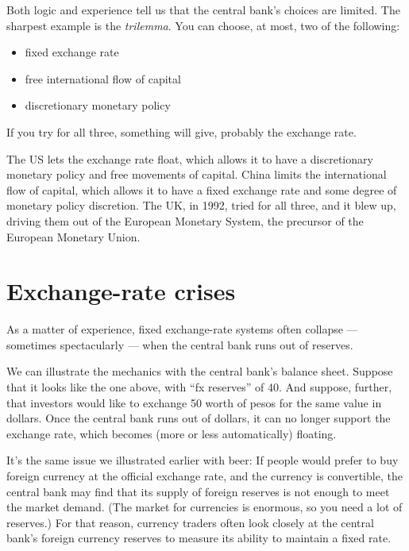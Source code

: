 Both logic and experience tell us that the central bank's  choices are limited.
The sharpest example is the {\it trilemma\/}.
You can choose, at most, two of the following:
\begin{itemize}
\item fixed exchange rate
\item free international flow of capital
\item discretionary monetary policy 
\end{itemize}
If you try for all three, something will give, probably the exchange rate.

The US lets the exchange rate float, which allows it to have a discretionary
monetary policy and free movements of capital.
China limits the international flow of capital,
which allows it to have a fixed exchange rate and some degree of monetary policy discretion.
The UK, in 1992, tried for all three, and it blew up, driving them out
of the European Monetary System, the precursor of the European Monetary Union.


\section{Exchange-rate crises}

As a matter of experience, fixed exchange-rate systems often collapse ---
sometimes spectacularly --- when the central bank  runs out of reserves.

We can illustrate the mechanics with the central bank's  balance sheet.
Suppose that it looks like the one above, with ``fx reserves'' of 40.
And suppose, further, that investors
would like to exchange 50 worth of pesos for the same value in dollars.
Once the central bank  runs out of dollars, it can no longer support
the exchange rate, which becomes (more or less automatically) floating.

It's the same issue we illustrated earlier with beer: If people would prefer to buy foreign currency at the official
exchange rate,
and the currency is convertible,
the central bank  may find that its supply of foreign reserves is not
enough to meet the market demand.
(The market for currencies is enormous, so you need a lot of reserves.)
For that reason, currency traders often look closely at the central bank's 
foreign currency reserves to measure its ability to maintain a fixed rate.

